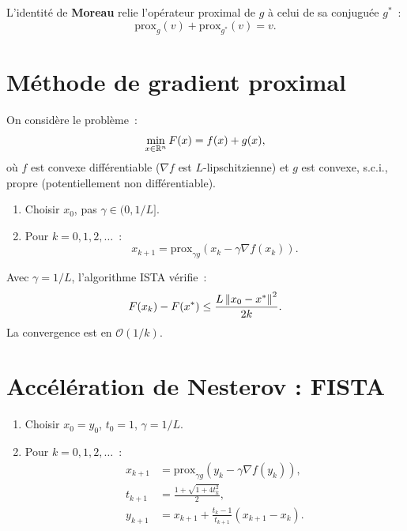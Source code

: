 \begin{definition}
L'identit\'e de \textbf{Moreau} relie l'op\'erateur proximal de $g$ \`a
celui de sa conjugu\'ee $g^*$~:
\[
  \mathrm{prox}_g(v) + \mathrm{prox}_{g^*}(v) = v.
\]
\end{definition}

\section{M\'ethode de gradient proximal}

\begin{definition}
On consid\`ere le probl\`eme~:
\[
  \min_{x \in \mathbb{R}^n} F(x) = f(x) + g(x),
\]
o\`u $f$ est convexe diff\'erentiable ($\nabla f$ est $L$-lipschitzienne)
et $g$ est convexe, s.c.i., propre (potentiellement non diff\'erentiable).
\end{definition}

\begin{algorithme}[title=\textbf{Gradient proximal (ISTA)}]
\begin{enumerate}
  \item Choisir $x_0$, pas $\gamma \in (0, 1/L]$.
  \item Pour $k = 0, 1, 2, \ldots$~:
  \[
    x_{k+1} = \mathrm{prox}_{\gamma g}\!\left(x_k - \gamma \nabla f(x_k)\right).
  \]
\end{enumerate}
\end{algorithme}

\begin{theoreme}
Avec $\gamma = 1/L$, l'algorithme ISTA v\'erifie~:
\[
  F(x_k) - F(x^*) \leq \frac{L \left\| x_0 - x^* \right\|^2}{2k}.
\]
La convergence est en $\mathcal{O}(1/k)$.
\end{theoreme}

\section{Acc\'el\'eration de Nesterov : FISTA}

\begin{algorithme}[title=\textbf{FISTA (Fast ISTA)}]
\begin{enumerate}
  \item Choisir $x_0 = y_0$, $t_0 = 1$, $\gamma = 1/L$.
  \item Pour $k = 0, 1, 2, \ldots$~:
  \begin{align*}
    x_{k+1} &= \mathrm{prox}_{\gamma g}\!\left(y_k - \gamma \nabla f(y_k)\right), \\
    t_{k+1} &= \frac{1 + \sqrt{1 + 4 t_k^2}}{2}, \\
    y_{k+1} &= x_{k+1} + \frac{t_k - 1}{t_{k+1}}(x_{k+1} - x_k).
  \end{align*}
\end{enumerate}
\end{algorithme}

